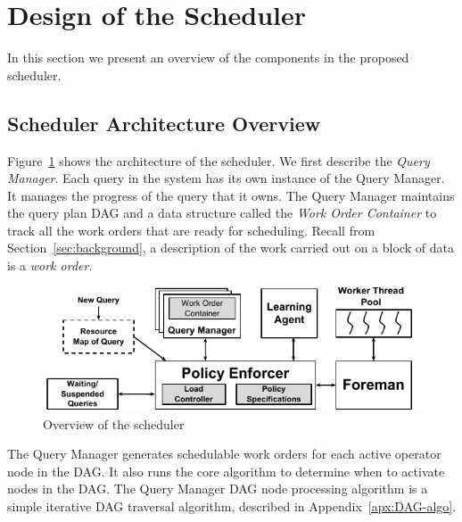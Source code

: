 \section{Design of the Scheduler}\label{sec:design}
In this section we present an overview of the components in the proposed \sys{} scheduler.

\subsection{Scheduler Architecture Overview}\label{ssec:scheduler-arch}
Figure~\ref{fig:scheduler-architecture} shows the architecture of the \sys{} scheduler.
We first describe the \textit{Query Manager}. 
Each query in the system has its own instance of the Query Manager.
It manages the progress of the query that it owns.
The Query Manager maintains the query plan DAG and a data structure called
the \textit{Work Order Container} to track all the work orders that are ready for
scheduling. 
Recall from Section~\ref{sec:background}, a description of the work 
carried out on a block of data is a \textit{work order}. 

\begin{figure}
	\centering
	\includegraphics[width=\columnwidth]{figures/Scheduler-Architecture.pdf}
	\vspace*{-1.5em}
	\caption{Overview of the scheduler}
	\label{fig:scheduler-architecture}
	\vspace*{-1.5em}
\end{figure}

The Query Manager generates schedulable work orders for each active operator node
in the DAG. %
It also runs the core algorithm to determine when to activate nodes in the DAG. 
The Query Manager DAG node processing algorithm is a simple iterative DAG traversal algorithm, described in Appendix~\ref{apx:DAG-algo}. 

